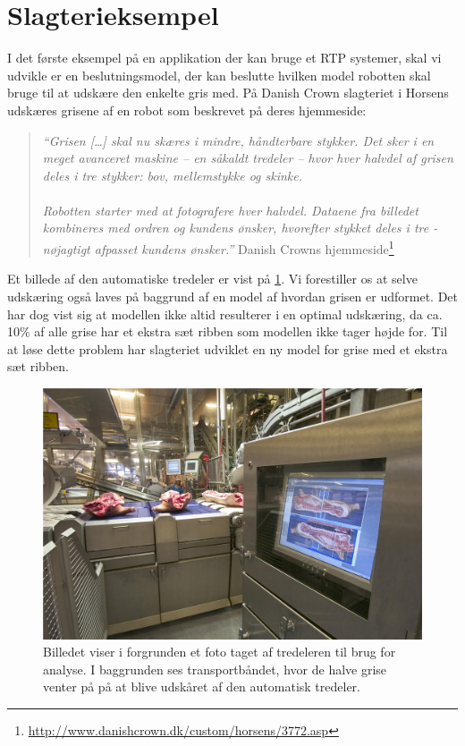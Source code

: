 \section{Slagterieksempel}
I det første eksempel på en applikation der kan bruge et RTP systemer, skal vi udvikle er en beslutningsmodel, der kan beslutte hvilken model robotten skal bruge til at  udskære den enkelte gris med. På Danish Crown slagteriet i Horsens udskæres grisene af en robot som beskrevet på deres hjemmeside:

\begin{quote}\textit{``Grisen [\ldots] skal nu skæres i mindre, håndterbare stykker. Det sker i en meget avanceret maskine -- en såkaldt tredeler -- hvor hver halvdel af grisen deles i tre stykker: bov, mellemstykke og skinke. \\ 
\\
Robotten starter med at fotografere hver halvdel. Dataene fra billedet kombineres med ordren og kundens ønsker, hvorefter stykket deles i tre - nøjagtigt afpasset kundens ønsker.''}{ Danish Crowns hjemmeside\footnote{\url{http://www.danishcrown.dk/custom/horsens/3772.asp}}}\end{quote}

Et billede af den automatiske tredeler er vist  på \cref{fig:pig}. Vi forestiller os at selve udskæring også laves på baggrund af en model af hvordan grisen er udformet. Det har dog vist sig at modellen ikke altid resulterer i en  optimal udskæring, da  ca. 10\% af alle grise har et ekstra sæt ribben som modellen ikke tager højde for. Til at løse dette problem har slagteriet udviklet en ny model for grise med et ekstra sæt ribben.

\begin{figure}
 \begin{center}
  \includegraphics[scale=0.5]{images/209690-1}
	\caption{Billedet viser i forgrunden  et foto taget af tredeleren til brug for analyse. I baggrunden ses transportbåndet, hvor de halve  grise venter på på at blive udskåret af den automatisk tredeler.}
	\label{fig:pig}
\end{center}
\end{figure}


